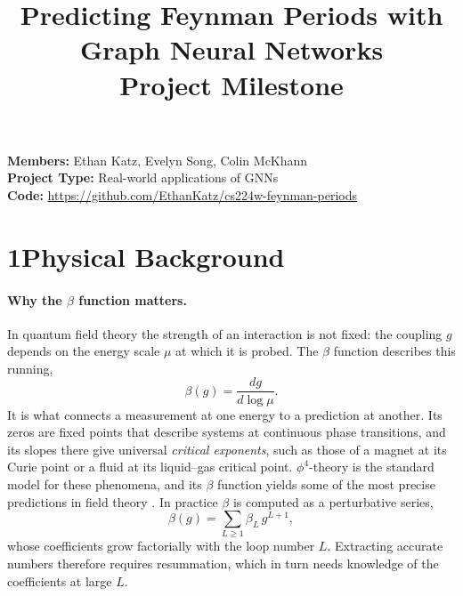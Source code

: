 \documentclass[11pt]{article}
\title{Predicting Feynman Periods with Graph Neural Networks\\[0.3em]\large Project Milestone}
\date{}
\begin{document}
\maketitle
\vspace{-3.5em}
\noindent\textbf{Members:} Ethan Katz, Evelyn Song, Colin McKhann\\
\textbf{Project Type:} Real-world applications of GNNs\\
\textbf{Code:} \url{https://github.com/EthanKatz/cs224w-feynman-periods}

\section*{1\quad Physical Background}

\paragraph{Why the $\beta$ function matters.} In quantum field theory the strength of an interaction
is not fixed: the coupling $g$ depends on the energy scale $\mu$ at which it is probed. The $\beta$
function describes this running,
\begin{equation*}
\beta(g) = \frac{dg}{d\log\mu}.
\end{equation*}
It is what connects a measurement at one energy to a prediction at another. Its zeros are fixed
points that describe systems at continuous phase transitions, and its slopes there give universal
\emph{critical exponents}, such as those of a magnet at its Curie point or a fluid at its liquid--gas
critical point. $\phi^4$-theory is the standard model for these phenomena, and its $\beta$ function
yields some of the most precise predictions in field theory \citep{wilson1974rg,kompaniets2017sixloop}.
In practice $\beta$ is computed as a perturbative series,
\begin{equation*}
\beta(g) = \sum_{L\ge1} \beta_L\, g^{L+1},
\end{equation*}
whose coefficients grow factorially with the loop number $L$. Extracting accurate numbers therefore
requires resummation, which in turn needs knowledge of the coefficients at large $L$.
\end{document}

